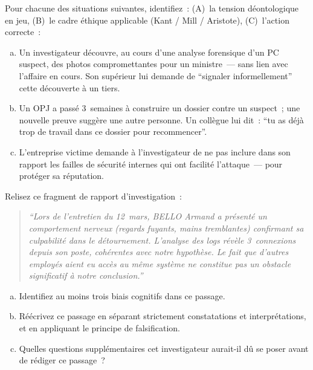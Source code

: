 \bigskip

\begin{boxexo}[title={\ding{45}\quad Exercice~13.1 --- Identification éthique \niveaubase}]
Pour chacune des situations suivantes, identifiez~: (A)~la tension
déontologique en jeu, (B)~le cadre éthique applicable (Kant / Mill /
Aristote), (C)~l'action correcte~:
\begin{enumerate}[(a)]
    \item Un investigateur découvre, au cours d'une analyse forensique
          d'un PC suspect, des photos compromettantes pour un ministre~---
          sans lien avec l'affaire en cours. Son supérieur lui demande
          de ``signaler informellement'' cette découverte à un tiers.
    \item Un OPJ a passé 3~semaines à construire un dossier contre un
          suspect~; une nouvelle preuve suggère une autre personne.
          Un collègue lui dit~: ``tu as déjà trop de travail dans ce
          dossier pour recommencer''.
    \item L'entreprise victime demande à l'investigateur de ne pas
          inclure dans son rapport les failles de sécurité internes
          qui ont facilité l'attaque~--- pour protéger sa réputation.
\end{enumerate}
\end{boxexo}

\begin{boxexo}[title={\ding{45}\quad Exercice~13.2 --- Biais cognitifs \niveaumoyen}]
Relisez ce fragment de rapport d'investigation~:

\begin{quote}
\textit{``Lors de l'entretien du 12~mars, BELLO Armand a présenté un
comportement nerveux (regards fuyants, mains tremblantes) confirmant
sa culpabilité dans le détournement. L'analyse des logs révèle 3~connexions
depuis son poste, cohérentes avec notre hypothèse. Le fait que d'autres
employés aient eu accès au même système ne constitue pas un obstacle
significatif à notre conclusion.''}
\end{quote}

\begin{enumerate}[(a)]
    \item Identifiez au moins trois biais cognitifs dans ce passage.
    \item Réécrivez ce passage en séparant strictement constatations
          et interprétations, et en appliquant le principe de falsification.
    \item Quelles questions supplémentaires cet investigateur aurait-il
          dû se poser avant de rédiger ce passage~?
\end{enumerate}
\end{boxexo}

